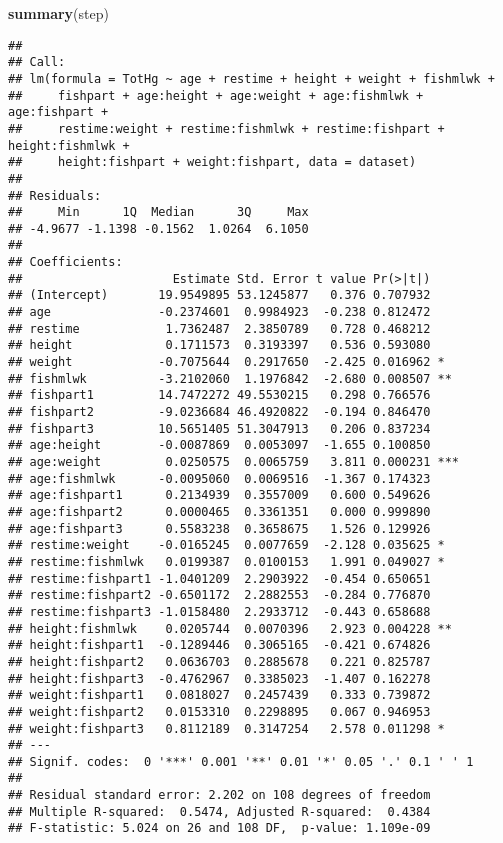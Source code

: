 \documentclass[12pt,]{article}
\newenvironment{Shaded}{\begin{snugshade}}{\end{snugshade}}
\newcommand{\KeywordTok}[1]{\textcolor[rgb]{0.13,0.29,0.53}{\textbf{#1}}}
\newcommand{\NormalTok}[1]{#1}
\begin{document}
\begin{Shaded}
\begin{Highlighting}[]
\KeywordTok{summary}\NormalTok{(step)}
\end{Highlighting}
\end{Shaded}

\begin{verbatim}
## 
## Call:
## lm(formula = TotHg ~ age + restime + height + weight + fishmlwk + 
##     fishpart + age:height + age:weight + age:fishmlwk + age:fishpart + 
##     restime:weight + restime:fishmlwk + restime:fishpart + height:fishmlwk + 
##     height:fishpart + weight:fishpart, data = dataset)
## 
## Residuals:
##     Min      1Q  Median      3Q     Max 
## -4.9677 -1.1398 -0.1562  1.0264  6.1050 
## 
## Coefficients:
##                     Estimate Std. Error t value Pr(>|t|)    
## (Intercept)       19.9549895 53.1245877   0.376 0.707932    
## age               -0.2374601  0.9984923  -0.238 0.812472    
## restime            1.7362487  2.3850789   0.728 0.468212    
## height             0.1711573  0.3193397   0.536 0.593080    
## weight            -0.7075644  0.2917650  -2.425 0.016962 *  
## fishmlwk          -3.2102060  1.1976842  -2.680 0.008507 ** 
## fishpart1         14.7472272 49.5530215   0.298 0.766576    
## fishpart2         -9.0236684 46.4920822  -0.194 0.846470    
## fishpart3         10.5651405 51.3047913   0.206 0.837234    
## age:height        -0.0087869  0.0053097  -1.655 0.100850    
## age:weight         0.0250575  0.0065759   3.811 0.000231 ***
## age:fishmlwk      -0.0095060  0.0069516  -1.367 0.174323    
## age:fishpart1      0.2134939  0.3557009   0.600 0.549626    
## age:fishpart2      0.0000465  0.3361351   0.000 0.999890    
## age:fishpart3      0.5583238  0.3658675   1.526 0.129926    
## restime:weight    -0.0165245  0.0077659  -2.128 0.035625 *  
## restime:fishmlwk   0.0199387  0.0100153   1.991 0.049027 *  
## restime:fishpart1 -1.0401209  2.2903922  -0.454 0.650651    
## restime:fishpart2 -0.6501172  2.2882553  -0.284 0.776870    
## restime:fishpart3 -1.0158480  2.2933712  -0.443 0.658688    
## height:fishmlwk    0.0205744  0.0070396   2.923 0.004228 ** 
## height:fishpart1  -0.1289446  0.3065165  -0.421 0.674826    
## height:fishpart2   0.0636703  0.2885678   0.221 0.825787    
## height:fishpart3  -0.4762967  0.3385023  -1.407 0.162278    
## weight:fishpart1   0.0818027  0.2457439   0.333 0.739872    
## weight:fishpart2   0.0153310  0.2298895   0.067 0.946953    
## weight:fishpart3   0.8112189  0.3147254   2.578 0.011298 *  
## ---
## Signif. codes:  0 '***' 0.001 '**' 0.01 '*' 0.05 '.' 0.1 ' ' 1
## 
## Residual standard error: 2.202 on 108 degrees of freedom
## Multiple R-squared:  0.5474, Adjusted R-squared:  0.4384 
## F-statistic: 5.024 on 26 and 108 DF,  p-value: 1.109e-09
\end{verbatim}
\end{document}
